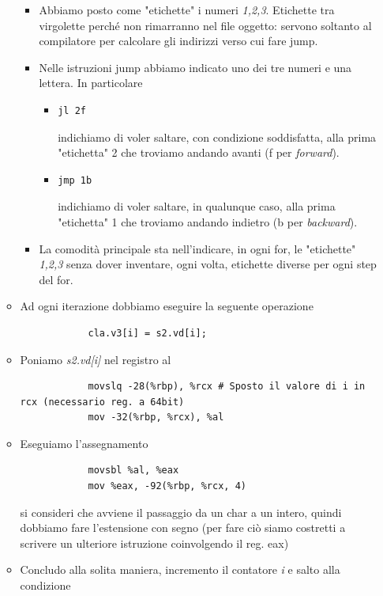\begin{itemize}
\begin{itemize}
\begin{framed}
			\begin{itemize}
				\item Abbiamo posto come "etichette" i numeri \emph{1,2,3}. Etichette tra virgolette perché non rimarranno nel file oggetto: servono soltanto al compilatore per calcolare gli indirizzi verso cui fare jump.
				\item Nelle istruzioni jump abbiamo indicato uno dei tre numeri e una lettera. In particolare
				\begin{itemize}
					\item \begin{verbatim}jl 2f\end{verbatim}indichiamo di voler saltare, con condizione soddisfatta, alla prima "etichetta" 2 che troviamo andando avanti (f per \emph{forward}).
					\item \begin{verbatim}jmp 1b\end{verbatim}indichiamo di voler saltare, in qualunque caso, alla prima "etichetta" 1 che troviamo andando indietro (b per \emph{backward}).
				\end{itemize}
				\item La comodità principale sta nell'indicare, in ogni for, le "etichette" \emph{1,2,3} senza dover inventare, ogni volta, etichette diverse per ogni step del for.
			\end{itemize}
		\end{framed}
		\item Ad ogni iterazione dobbiamo eseguire la seguente operazione
		\begin{verbatim}
			cla.v3[i] = s2.vd[i];
		\end{verbatim}
		\item Poniamo \emph{s2.vd[i]} nel registro al
		\begin{verbatim}
			movslq -28(%rbp), %rcx # Sposto il valore di i in rcx (necessario reg. a 64bit)
			mov -32(%rbp, %rcx), %al
		\end{verbatim}
		\item Eseguiamo l'assegnamento
		\begin{verbatim}
			movsbl %al, %eax
			mov %eax, -92(%rbp, %rcx, 4)
		\end{verbatim}
		si consideri che avviene il passaggio da un char a un intero, quindi dobbiamo fare l'estensione con segno (per fare ciò siamo costretti a scrivere un ulteriore istruzione coinvolgendo il reg. eax)
		\item Concludo alla solita maniera, incremento il contatore \emph{i} e salto alla condizione

\end{itemize}
\end{itemize}

